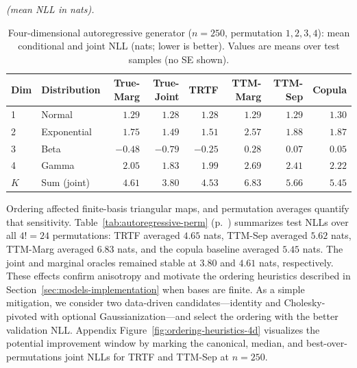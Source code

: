 \documentclass[11pt,a4paper,twoside]{book}\usepackage[]{graphicx}\usepackage[]{xcolor}
\begin{document}
\begin{table}[htbp]
  \centering
  \textit{(mean NLL in nats).}
  \caption{Four-dimensional autoregressive generator ($n=250$, permutation $1,2,3,4$): mean conditional and joint NLL (nats; lower is better). Values are means over test samples (no SE shown).}
  \label{tab:autoregressive-nll}
  \begin{tabular}{llrrrrrr}
    \hline
    Dim & Distribution & True-Marg & True-Joint & TRTF & TTM-Marg & TTM-Sep & Copula \\
    \hline
    1 & Normal      & $1.29$ & $1.28$ & $1.28$ & $1.29$ & $1.29$ & $1.30$ \\
    2 & Exponential & $1.75$ & $1.49$ & $1.51$ & $2.57$ & $1.88$ & $1.87$ \\
    3 & Beta        & $-0.48$ & $-0.79$ & $-0.25$ & $0.28$ & $0.07$ & $0.05$ \\
    4 & Gamma       & $2.05$ & $1.83$ & $1.99$ & $2.69$ & $2.41$ & $2.22$ \\
    $K$ & Sum (joint) & $4.61$ & $3.80$ & $4.53$ & $6.83$ & $5.66$ & $5.45$ \\
    \hline
  \end{tabular}
\end{table}

Ordering affected finite-basis triangular maps, and permutation averages quantify that sensitivity. Table~\ref{tab:autoregressive-perm} (p.~\pageref{tab:autoregressive-perm}) summarizes test NLLs over all $4! = 24$ permutations: TRTF averaged $4.65$ nats, TTM-Sep averaged $5.62$ nats, TTM-Marg averaged $6.83$ nats, and the copula baseline averaged $5.45$ nats. The joint and marginal oracles remained stable at $3.80$ and $4.61$ nats, respectively. These effects confirm anisotropy and motivate the ordering heuristics described in Section~\ref{sec:models-implementation} when bases are finite. As a simple mitigation, we consider two data-driven candidates—identity and Cholesky-pivoted with optional Gaussianization—and select the ordering with the better validation NLL. Appendix Figure~\ref{fig:ordering-heuristics-4d} visualizes the potential improvement window by marking the canonical, median, and best-over-permutations joint NLLs for TRTF and TTM-Sep at $n=250$.
\end{document}
